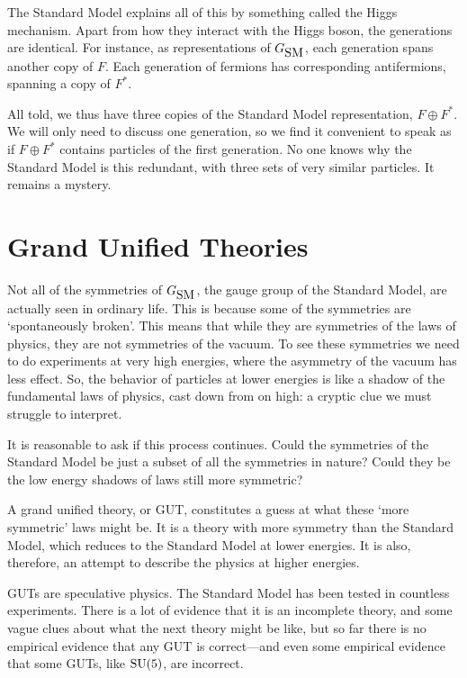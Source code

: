 \documentclass{article}
\newcommand{\SU}{{\rm SU}}    %
\newcommand{\GSM}{{G_{\mbox{\rm SM}}}}  %
\begin{document}
The Standard Model explains all of this by something called the Higgs
mechanism.  Apart from how they interact with the Higgs boson, the
generations are identical. For instance, as representations of $\GSM$,
each generation spans another copy of $F$.  Each generation of
fermions has corresponding antifermions, spanning a copy of $F^*$.

All told, we thus have three copies of the Standard Model
representation, $F \oplus F^*$.  We will only need to discuss one
generation, so we find it convenient to speak as if $F \oplus F^*$
contains particles of the first generation.  No one knows why the
Standard Model is this redundant, with three sets of very similar
particles.  It remains a mystery.

\section{Grand Unified Theories} \label{sec:guts}

Not all of the symmetries of $\GSM$, the gauge group of the Standard
Model, are actually seen in ordinary life.  This is because some of
the symmetries are `spontaneously broken'.  This means that while they
are symmetries of the laws of physics, they are not symmetries of the
vacuum.  To see these symmetries we need to do experiments at
very high energies, where the asymmetry of the vacuum has less effect.
So, the behavior of particles at lower energies is like a shadow of
the fundamental laws of physics, cast down from on high: a cryptic
clue we must struggle to interpret.

It is reasonable to ask if this process continues.  Could the
symmetries of the Standard Model be just a subset of all the
symmetries in nature? Could they be the low energy shadows of laws
still more symmetric?

A grand unified theory, or GUT, constitutes a guess at what these
`more symmetric' laws might be. It is a theory with more symmetry than
the Standard Model, which reduces to the Standard Model at lower
energies. It is also, therefore, an attempt to describe the physics at
higher energies.

GUTs are speculative physics.  The Standard Model has been tested in
countless experiments.  There is a lot of evidence that it is an
incomplete theory, and some vague clues about what the next theory
might be like, but so far there is no empirical evidence that any GUT
is correct---and even some empirical evidence that some GUTs, like
$\SU(5)$, are incorrect.
\end{document}
